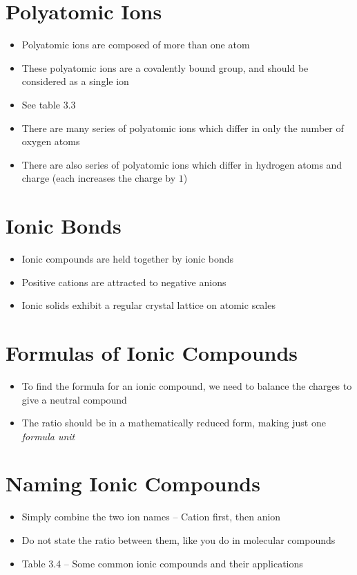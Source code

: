 \documentclass[12pt, openany, letterpaper]{memoir}
\begin{document}
\section{Polyatomic Ions}
\begin{itemize}
	\item Polyatomic ions are composed of more than one atom
	\item These polyatomic ions are a covalently bound group, and should be considered as a single ion
	\item See table 3.3
	\item There are many series of polyatomic ions which differ in only the number of oxygen atoms
	\item There are also series of polyatomic ions which differ in hydrogen atoms and charge (each  increases the charge by $1$)
\end{itemize}

\section{Ionic Bonds}
\begin{itemize}
	\item Ionic compounds are held together by ionic bonds
	\item Positive cations are attracted to negative anions
	\item Ionic solids exhibit a regular crystal lattice on atomic scales
\end{itemize}

\section{Formulas of Ionic Compounds}
\begin{itemize}
	\item To find the formula for an ionic compound, we need to balance the charges to give a neutral compound
	\item The ratio should be in a mathematically reduced form, making just one \emph{formula unit}
\end{itemize}

\section{Naming Ionic Compounds}
\begin{itemize}
	\item Simply combine the two ion names -- Cation first, then anion
	\item Do not state the ratio between them, like you do in molecular compounds
	\item Table 3.4 -- Some common ionic compounds and their applications
\end{itemize}
\end{document}

